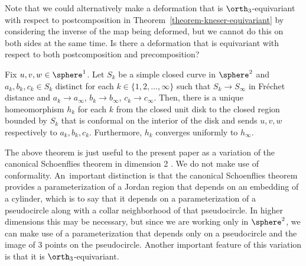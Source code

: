\begin{question}
Note that we could alternatively make a deformation that is $\orth_3$\nobreakdash-equivariant with respect to postcomposition in Theorem~\ref{theorem-kneser-equivariant} by considering the inverse of the map being deformed, but we cannot do this on both sides at the same time. Is there a deformation that is equivariant with respect to both postcomposition and precomposition?
\end{question}

\begin{theorem}\label{theorem-conformal}
Fix $u,v,w \in \sphere^1$.
Let $S_k$ be a simple closed curve in $\sphere^2$ and $a_k,b_k,c_k \in S_k$ distinct for each $k \in \{1,2,\dots,\infty\}$ such that $S_k \to S_\infty$ in Fréchet distance and $a_k \to a_\infty$, $b_k \to b_\infty$, $c_k \to c_\infty$.
Then, there is a unique homeomorphism $h_k$ for each $k$ from the closed unit disk to the closed region bounded by $S_k$ that is conformal on the interior of the disk and sends $u,v,w$
respectively to $a_k,b_k,c_k$.
Furthermore, $h_k$ converges uniformly to $h_\infty$.
\end{theorem}

The above theorem is just useful to the present paper as a variation of the canonical Schoenflies theorem in dimension 2 \cite{gauld1971canonical}. We do not make use of conformality. An~important distinction is that the canonical Schoenflies theorem provides a parameterization of a Jordan region that depends on an embedding of a cylinder, which is to say that it depends on a parameterization of a pseudocircle along with a collar neighborhood of that pseudocircle. In higher dimensions this may be necessary, but since we are working only in $\sphere^2$, we can make use of a parameterization that depends only on a pseudocircle and the image of $3$ points on the pseudocircle.
Another important feature of this variation is that it is $\orth_3$-equivariant.

